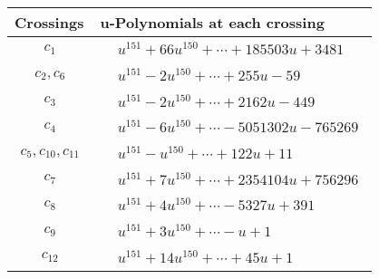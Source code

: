 \documentclass[1p]{elsarticle_modified}
\theoremstyle{definition}
\begin{document}
\begin{tabular}{m{50pt}|m{274pt}}
Crossings & \hspace{64pt}u-Polynomials at each crossing \\
\hline $$\begin{aligned}c_{1}\end{aligned}$$&$\begin{aligned}
&u^{151}+66 u^{150}+\cdots+185503 u+3481
\end{aligned}$\\
\hline $$\begin{aligned}c_{2},c_{6}\end{aligned}$$&$\begin{aligned}
&u^{151}-2 u^{150}+\cdots+255 u-59
\end{aligned}$\\
\hline $$\begin{aligned}c_{3}\end{aligned}$$&$\begin{aligned}
&u^{151}-2 u^{150}+\cdots+2162 u-449
\end{aligned}$\\
\hline $$\begin{aligned}c_{4}\end{aligned}$$&$\begin{aligned}
&u^{151}-6 u^{150}+\cdots-5051302 u-765269
\end{aligned}$\\
\hline $$\begin{aligned}c_{5},c_{10},c_{11}\end{aligned}$$&$\begin{aligned}
&u^{151}- u^{150}+\cdots+122 u+11
\end{aligned}$\\
\hline $$\begin{aligned}c_{7}\end{aligned}$$&$\begin{aligned}
&u^{151}+7 u^{150}+\cdots+2354104 u+756296
\end{aligned}$\\
\hline $$\begin{aligned}c_{8}\end{aligned}$$&$\begin{aligned}
&u^{151}+4 u^{150}+\cdots-5327 u+391
\end{aligned}$\\
\hline $$\begin{aligned}c_{9}\end{aligned}$$&$\begin{aligned}
&u^{151}+3 u^{150}+\cdots- u+1
\end{aligned}$\\
\hline $$\begin{aligned}c_{12}\end{aligned}$$&$\begin{aligned}
&u^{151}+14 u^{150}+\cdots+45 u+1
\end{aligned}$\\
\hline
\end{tabular}\\~\\
\end{document}
